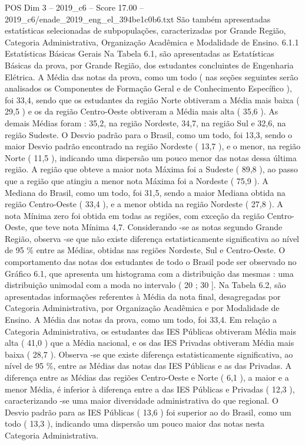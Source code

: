 \begin{textsample}{POS Dim 3 – 2019\_c6 – Score 17.00 – 2019\_c6/enade\_2019\_eng\_el\_394be1c0b6.txt}
São também apresentadas estatísticas selecionadas de subpopulações, caracterizadas por Grande Região, Categoria Administrativa, Organização Acadêmica e Modalidade de Ensino. 6.1.1 Estatísticas Básicas Gerais Na Tabela 6.1, são apresentadas as Estatísticas Básicas da prova, por Grande Região, dos estudantes concluintes de Engenharia Elétrica.
A Média das notas da prova, como um todo ( nas seções seguintes serão analisados os Componentes de Formação Geral e de Conhecimento Específico ), foi 33,4, sendo que os estudantes da região Norte obtiveram a Média mais baixa ( 29,5 ) e os da região Centro-Oeste obtiveram a Média mais alta ( 35,6 ).
As demais Médias foram : 35,2, na região Nordeste, 34,7, na região Sul e 32,6, na região Sudeste.
O Desvio padrão para o Brasil, como um todo, foi 13,3, sendo o maior Desvio padrão encontrado na região Nordeste ( 13,7 ), e o menor, na região Norte ( 11,5 ), indicando uma dispersão um pouco menor das notas dessa última região.
A região que obteve a maior nota Máxima foi a Sudeste ( 89,8 ), ao passo que a região que atingiu a menor nota Máxima foi a Nordeste ( 75,9 ).
A Mediana do Brasil, como um todo, foi 31,5, sendo a maior Mediana obtida na região Centro-Oeste ( 33,4 ), e a menor obtida na região Nordeste ( 27,8 ).
A nota Mínima zero foi obtida em todas as regiões, com exceção da região Centro-Oeste, que teve nota Mínima 4,7.
Considerando -se as notas segundo Grande Região, observa -se que não existe diferença estatisticamente significativa ao nível de 95 \% entre as Médias, obtidas nas regiões Nordeste, Sul e Centro-Oeste.
O comportamento das notas dos estudantes de todo o Brasil pode ser observado no Gráfico 6.1, que apresenta um histograma com a distribuição das mesmas : uma distribuição unimodal com a moda no intervalo ( 20 ; 30 ].
Na Tabela 6.2, são apresentadas informações referentes à Média da nota final, desagregadas por Categoria Administrativa, por Organização Acadêmica e por Modalidade de Ensino.
A Média das notas da prova, como um todo, foi 33,4.
Em relação a Categoria Administrativa, os estudantes das IES Públicas obtiveram Média mais alta ( 41,0 ) que a Média nacional, e os das IES Privadas obtiveram Média mais baixa ( 28,7 ).
Observa -se que existe diferença estatisticamente significativa, ao nível de 95 \%, entre as Médias das notas das IES Públicas e as das Privadas.
A diferença entre as Médias das regiões Centro-Oeste e Norte ( 6,1 ), a maior e a menor Média, é inferior à diferença entre a das IES Públicas e Privadas ( 12,3 ), caracterizando -se uma maior diversidade administrativa do que regional.
O Desvio padrão para as IES Públicas ( 13,6 ) foi superior ao do Brasil, como um todo ( 13,3 ), indicando uma dispersão um pouco maior das notas nesta Categoria Administrativa.

\end{textsample}
